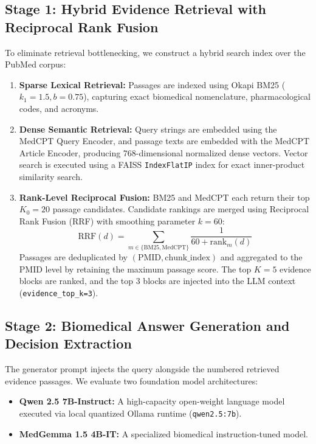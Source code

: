 \documentclass[journal,10pt]{IEEEtran}
\begin{document}
\subsection{Stage 1: Hybrid Evidence Retrieval with Reciprocal Rank Fusion}
To eliminate retrieval bottlenecking, we construct a hybrid search index over the PubMed corpus:
\begin{enumerate}
    \item \textbf{Sparse Lexical Retrieval:} Passages are indexed using Okapi BM25 ($k_1 = 1.5, b = 0.75$), capturing exact biomedical nomenclature, pharmacological codes, and acronyms.
    \item \textbf{Dense Semantic Retrieval:} Query strings are embedded using the MedCPT Query Encoder, and passage texts are embedded with the MedCPT Article Encoder, producing 768-dimensional normalized dense vectors. Vector search is executed using a FAISS \texttt{IndexFlatIP} index for exact inner-product similarity search.
    \item \textbf{Rank-Level Reciprocal Fusion:} BM25 and MedCPT each return their top $K_0 = 20$ passage candidates. Candidate rankings are merged using Reciprocal Rank Fusion (RRF) with smoothing parameter $k = 60$:
    \begin{equation}
    \text{RRF}(d) = \sum_{m \in \{\text{BM25}, \text{MedCPT}\}} \frac{1}{60 + \text{rank}_m(d)}
    \end{equation}
    Passages are deduplicated by $(\text{PMID}, \text{chunk\_index})$ and aggregated to the PMID level by retaining the maximum passage score. The top $K=5$ evidence blocks are ranked, and the top 3 blocks are injected into the LLM context (\texttt{evidence\_top\_k=3}).
\end{enumerate}

\subsection{Stage 2: Biomedical Answer Generation and Decision Extraction}
The generator prompt injects the query alongside the numbered retrieved evidence passages. We evaluate two foundation model architectures:
\begin{itemize}
    \item \textbf{Qwen 2.5 7B-Instruct:} A high-capacity open-weight language model executed via local quantized Ollama runtime (\texttt{qwen2.5:7b}).
    \item \textbf{MedGemma 1.5 4B-IT:} A specialized biomedical instruction-tuned model.
\end{itemize}
\end{document}
